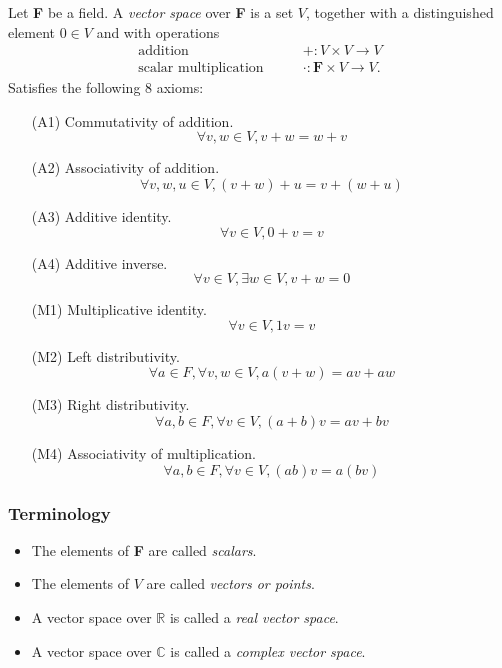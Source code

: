 \documentclass[11pt]{article}
\begin{document}
    Let \textbf{F} be a field. A \emph{vector space} over \textbf{F} is a set $V$, together with a distinguished element \(0 \in V\) and with operations 
    \begin{align*}
        \text{addition} \qquad              & + : V \times V \rightarrow V \\
        \text{scalar multiplication} \qquad & \cdot : \textbf{F} \times V \rightarrow V.
    \end{align*}
    Satisfies the following 8 axioms:
    \begin{enumerate}
        \item[(A1)] Commutativity of addition. \[\forall v,w \in V, v + w = w + v\] 
        \item[(A2)] Associativity of addition. \[\forall v,w,u \in V, (v+w)+u = v+(w+u)\]
        \item[(A3)] Additive identity. \[\forall v \in V, 0 + v = v\]
        \item[(A4)] Additive inverse. \[\forall v \in V, \exists w \in V, v + w = 0\]
        \item[(M1)] Multiplicative identity. \[\forall v \in V, 1v = v\]
        \item[(M2)] Left distributivity. \[\forall a \in F, \forall v,w \in V, a(v+w) = av + aw\]
        \item[(M3)] Right distributivity. \[\forall a,b \in F, \forall v \in V, (a+b)v = av + bv\]
        \item[(M4)] Associativity of multiplication. \[\forall a,b \in F, \forall v \in V, (ab)v = a(bv)\]    
    \end{enumerate}

    \subsubsection{Terminology}

    \begin{itemize}
        \item The elements of \textbf{F} are called \emph{scalars}.
        \item The elements of $V$ are called \emph{vectors or points}.
        \item A vector space over \(\mathbb{R}\) is called a \emph{real vector space}.
        \item A vector space over \(\mathbb{C}\) is called a \emph{complex vector space}.
    \end{itemize}

    \pagebreak
\end{document}
